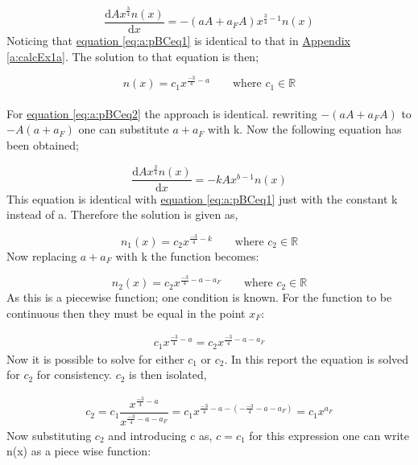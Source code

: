 \documentclass{article}
\numberwithin{equation}{section} %
\newcommand{\md}{\mathrm{d}}
\begin{document}
\begin{equation}\label{eq:a:pBCeq2}
	\dfrac{\md Ax^{\tfrac{3}{4}}n(x)}{\md x} = -(aA+a_FA)x^{\tfrac{3}{4}-1}n(x)
\end{equation}
Noticing that \hyperref[eq:a:pBCeq1]{equation \ref{eq:a:pBCeq1}} is identical to that in \hyperref[a:calcEx1a]{Appendix \ref{a:calcEx1a}}. The solution to that equation is then;

\begin{equation}
	n(x) = c_1x^{\tfrac{-3}{4}-a} \qquad \textrm{where } c_1 \in \mathbb{R}
\end{equation}\\
For \hyperref[eq:a:pBCeq2]{equation \ref{eq:a:pBCeq2}} the approach is identical. rewriting $-(aA+a_FA)$ to $-A(a+a_F)$ one can substitute $a+a_F$ with k. Now the following equation has been obtained;

\begin{equation}
	\dfrac{\md Ax^{\tfrac{3}{4}}n(x)}{\md x} = -kA x^{b-1}n(x)
\end{equation}
This equation is identical with \hyperref[eq:a:pBCeq1]{equation \ref{eq:a:pBCeq1}} just with the constant k instead of a. Therefore the solution is given as,

\begin{equation}
	n_1(x) = c_2x^{\tfrac{-3}{4}-k} \qquad \textrm{where } c_2 \in \mathbb{R}
\end{equation}
Now replacing $a+a_F$ with k the function becomes:

\begin{equation}
	n_2(x) = c_2x^{\tfrac{-3}{4}-a-a_F} \qquad \textrm{where } c_2 \in \mathbb{R}
\end{equation}
As this is a piecewise function; one condition is known. For the function to be continuous then they must be equal in the point $x_F$: 

\begin{align}
	c_1x^{\tfrac{-3}{4}-a} = c_2x^{\tfrac{-3}{4}-a-a_F}
\end{align}
Now it is possible to solve for either $c_1$ or $c_2$. In this report the equation is solved for $c_2$ for consistency. $c_2$ is then isolated,

\begin{align}
	c_2 = c_1\dfrac{x^{\tfrac{-3}{4}-a}}{x^{\tfrac{-3}{4}-a-a_F}} = c_1 x^{\tfrac{-3}{4}-a-(-\tfrac{-3}{4}-a-a_F)}=c_1x^{a_F}
\end{align}
Now substituting $c_2$ and introducing c as, $c=c_1$ for this expression one can write n(x) as a piece wise function:
\end{document}
